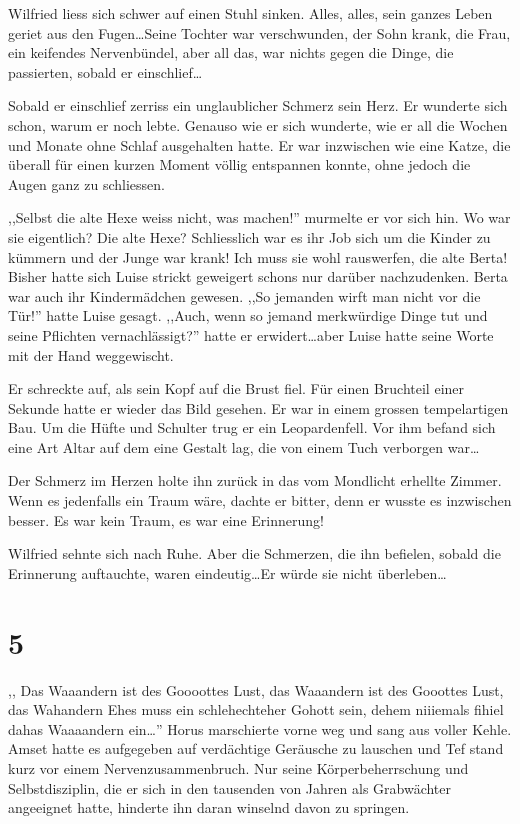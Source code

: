 \documentclass[11pt,titlepage,a5paper]{book}
\begin{document}
Wilfried liess sich schwer auf einen Stuhl sinken. Alles, alles, sein ganzes Leben geriet aus den Fugen\dots Seine Tochter war verschwunden, der Sohn krank, die Frau, ein keifendes Nervenbündel, aber all das, war nichts gegen die Dinge, die passierten, sobald er einschlief\dots

Sobald er einschlief zerriss ein unglaublicher Schmerz sein Herz. Er wunderte sich schon, warum er noch lebte. Genauso wie er sich wunderte, wie er all die Wochen und Monate ohne Schlaf ausgehalten hatte. Er war inzwischen wie eine Katze, die überall für einen kurzen Moment völlig entspannen konnte, ohne jedoch die Augen ganz zu schliessen. 

,,Selbst die alte Hexe weiss nicht, was machen!'' murmelte er vor sich hin. Wo war sie eigentlich? Die alte Hexe? Schliesslich war es ihr Job sich um die Kinder zu kümmern und der Junge war krank! Ich muss sie wohl rauswerfen, die alte Berta! Bisher hatte sich Luise strickt geweigert schons nur darüber nachzudenken. Berta war auch ihr Kindermädchen gewesen. ,,So jemanden wirft man nicht vor die Tür!'' hatte Luise gesagt. ,,Auch, wenn so jemand merkwürdige Dinge tut und seine Pflichten vernachlässigt?'' hatte er erwidert\dots aber Luise hatte seine Worte mit der Hand weggewischt.

Er schreckte auf, als sein Kopf auf die Brust fiel. Für einen Bruchteil einer Sekunde hatte er wieder das Bild gesehen. Er war in einem grossen tempelartigen Bau. Um die Hüfte und Schulter trug er ein Leopardenfell. Vor ihm befand sich eine Art Altar auf dem eine Gestalt lag, die von einem Tuch verborgen war\dots 

Der Schmerz im Herzen holte ihn zurück in das vom Mondlicht erhellte Zimmer. Wenn es jedenfalls ein Traum wäre, dachte er bitter, denn er wusste es inzwischen besser. Es war kein Traum, es war eine Erinnerung!

Wilfried sehnte sich nach Ruhe. Aber die Schmerzen, die ihn befielen, sobald die Erinnerung auftauchte, waren eindeutig\dots Er würde sie nicht überleben\dots

\section*{5}

,, \eighthnote \twonotes{} Das Waaandern ist des Goooottes  Lust,  \eighthnote \twonotes{} das Waaandern ist des Gooottes Lust, das Wahandern \eighthnote \twonotes{} Ehes muss ein schlehechteher Gohott sein, \eighthnote \twonotes{} dehem niiiemals fihiel dahas Waaaandern ein\dots '' Horus marschierte vorne weg und sang aus voller Kehle. Amset hatte es aufgegeben auf verdächtige Geräusche zu lauschen und Tef stand kurz vor einem Nervenzusammenbruch. Nur seine Körperbeherrschung und Selbstdisziplin, die er sich in den tausenden von Jahren als Grabwächter angeeignet hatte, hinderte ihn daran winselnd davon zu springen.
\end{document}
